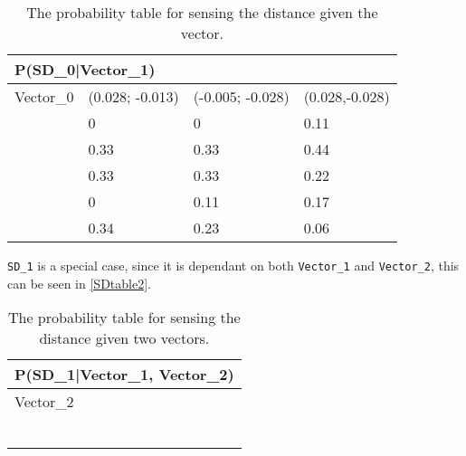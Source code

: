 \begin{center}
\begin{table}[H]
\begin{tabular}{|l|l|l|l|}
\hline
\multicolumn{4}{|l|}{P(SD\_0|Vector\_1)} \\ \hline
Vector\_0     & (0.028; -0.013) & (-0.005; -0.028) & (0.028,-0.028)  \\\hline   
[0 - 60]      & 0    & 0    & 0.11 \\ \hline 
[60 - 75]    & 0.33 & 0.33 & 0.44 \\ \hline
[75 - 90]   & 0.33 & 0.33 & 0.22 \\ \hline
[90 - 105]   & 0    & 0.11 & 0.17 \\ \hline
[105 - 255]   & 0.34 & 0.23 & 0.06   \\ \hline
\end{tabular}
\caption{The probability table for sensing the distance given the vector.}
\label{SDtable}
\end{table}
\end{center}

\texttt{SD\_1} is a special case, since it is dependant on
both \texttt{Vector\_1} and \texttt{Vector\_2}, this can be seen in
\autoref{SDtable2}.

\begin{table}[H]
\centering
\begin{tabular}{|l|l|l|l|l|l|l|l|l|l|}
\hline
\multicolumn{10}{|l|}{P(SD\_1|Vector\_1, Vector\_2)} \\\hline 
Vector\_2 & \multicolumn{3}{l|}{} & \multicolumn{3}{l|}{} &
\multicolumn{3}{l|}{}\\\hline 
 &       &       &       &       &       &       &       &       &       \\
\hline &       &       &       &       &       &       &       &       &       \\ \hline
 &       &       &       &       &       &       &       &       &       \\ \hline
 &       &       &       &       &       &       &       &       &       \\ \hline
 &       &       &       &       &       &       &       &       &       \\ \hline
 &       &       &       &       &       &       &       &       &       \\ \hline
\end{tabular}
\caption{The probability table for sensing the distance given two vectors.}
\label{SDtable2}
\end{table}

